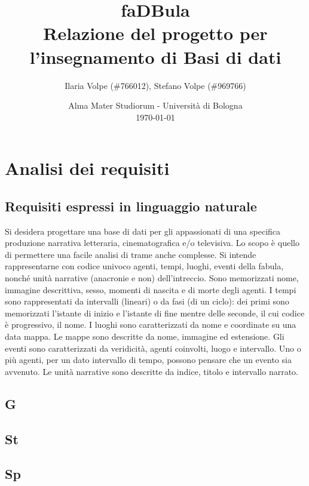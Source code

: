 \documentclass{article}
\title{
  faDBula \\
  \textbf{\large
      Relazione del progetto per l'insegnamento di \break
      Basi di dati
  }
}
\author{
  Ilaria Volpe (\#766012),
  Stefano Volpe (\#969766)
}
\date{
	Alma Mater Studiorum - Universit\`a di Bologna \\
  \today
}
\begin{document}
\maketitle

\section{Analisi dei requisiti}

\subsection{Requisiti espressi in linguaggio naturale}

Si desidera progettare una base di dati per gli appassionati di una specifica
produzione narrativa letteraria, cinematografica e/o televisiva. Lo scopo è
quello di permettere una facile analisi di trame anche complesse. Si intende
rappresentarne con codice univoco agenti, tempi, luoghi, eventi della fabula,
nonché unità narrative (anacronie e non) dell'intreccio. Sono memorizzati nome,
immagine descrittiva, sesso, momenti di nascita e di morte degli agenti. I
tempi sono rappresentati da intervalli (lineari) o da fasi (di un ciclo): dei
primi sono memorizzati l'istante di inizio e l'istante di fine mentre delle
seconde, il cui codice è progressivo, il nome. I luoghi sono caratterizzati da
nome e coordinate su una data mappa. Le mappe sono descritte da nome, immagine
ed estensione. Gli eventi sono caratterizzati da veridicità, agenti coinvolti,
luogo e intervallo. Uno o più agenti, per un dato intervallo di tempo, possono
pensare che un evento sia avvenuto. Le unità narrative sono descritte da indice,
titolo e intervallo narrato.

\subsection{G}

\subsection{St}

\subsection{Sp}
\end{document}
